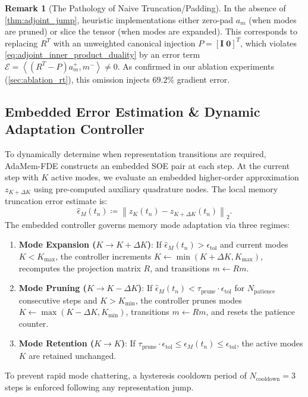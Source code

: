 \documentclass[11pt,a4paper]{article}
\theoremstyle{plain}
\theoremstyle{definition}
\newtheorem{remark}[theorem]{Remark}
\newcommand{\etol}{\epsilon_{\mathrm{tol}}}
\newcommand{\inner}[2]{\left\langle #1, #2 \right\rangle}
\newcommand{\norm}[1]{\left\| #1 \right\|}
\begin{document}
\begin{remark}[The Pathology of Naive Truncation/Padding]
In the absence of \cref{thm:adjoint_jump}, heuristic implementations either zero-pad $a_m$ (when modes are pruned) or slice the tensor (when modes are expanded). This corresponds to replacing $R^T$ with an unweighted canonical injection $P = [\mathbf{I} \; \mathbf{0}]^T$, which violates \cref{eq:adjoint_inner_product_duality} by an error term $\mathcal{E} = \inner{(R^T - P) a_m^+}{m^-} \neq 0$. As confirmed in our ablation experiments (\cref{sec:ablation_rt}), this omission injects $69.2\%$ gradient error.
\end{remark}

\subsection{Embedded Error Estimation \& Dynamic Adaptation Controller}
To dynamically determine when representation transitions are required, AdaMem-FDE constructs an embedded SOE pair at each step. At the current step with $K$ active modes, we evaluate an embedded higher-order approximation $z_{K+\Delta K}$ using pre-computed auxiliary quadrature nodes. The local memory truncation error estimate is:
\begin{equation}
    \widehat{\epsilon}_M(t_n) \coloneqq \norm{ z_K(t_n) - z_{K+\Delta K}(t_n) }_2.
    \label{eq:error_estimator}
\end{equation}
The embedded controller governs memory mode adaptation via three regimes:
\begin{enumerate}
    \item \textbf{Mode Expansion ($K \to K + \Delta K$)}: If $\widehat{\epsilon}_M(t_n) > \etol$ and current modes $K < K_{\max}$, the controller increments $K \leftarrow \min(K + \Delta K, K_{\max})$, recomputes the projection matrix $R$, and transitions $m \leftarrow R m$.
    \item \textbf{Mode Pruning ($K \to K - \Delta K$)}: If $\widehat{\epsilon}_M(t_n) < \tau_{\mathrm{prune}} \cdot \etol$ for $N_{\mathrm{patience}}$ consecutive steps and $K > K_{\min}$, the controller prunes modes $K \leftarrow \max(K - \Delta K, K_{\min})$, transitions $m \leftarrow R m$, and resets the patience counter.
    \item \textbf{Mode Retention ($K \to K$)}: If $\tau_{\mathrm{prune}} \cdot \etol \le \widehat{\epsilon}_M(t_n) \le \etol$, the active modes $K$ are retained unchanged.
\end{enumerate}
To prevent rapid mode chattering, a hysteresis cooldown period of $N_{\mathrm{cooldown}} = 3$ steps is enforced following any representation jump.
\end{document}
